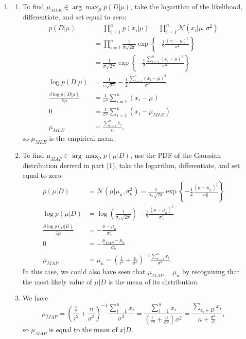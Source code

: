 \documentclass[submit]{harvardml}
\begin{document}
\begin{enumerate}
	\item 
	\begin{enumerate}
	
		\item To find $\mu_{MLE} \in \arg \max_\mu p(D|\mu)$, take the logarithm of the likelihood, differentiate, and set equal to zero:
		\begin{align*}
			p(D|\mu) &= \prod_{i=1}^n p(x_i | \mu)
			= \prod_{i=1}^n \mathcal{N}(x_i | \mu, \sigma^2) \\
			&= \prod_{i=1}^n \frac{1}{\sigma\sqrt{2\pi}}\exp\left\{-\frac12 \frac{(x_i - \mu)^2}{\sigma^2}\right\} \\
			&= \frac{1}{\sigma\sqrt{2\pi}} \exp\left\{-\frac12 \frac{\sum_{i=1}^n (x_i - \mu)^2}{\sigma^2}\right\} \\
			\log p(D|\mu) &= \frac{1}{\sigma\sqrt{2\pi}} - \frac12 \frac{\sum_{i=1}^n (x_i - \mu)^2}{\sigma^2} \\
			\frac{\partial \log p(D|\mu)}{\partial \mu} &= \frac{1}{\sigma^2} \sum_{i=1}^n(x_i - \mu) \\
			0 &= \frac{1}{\sigma^2} \sum_{i=1}^n(x_i - \mu_{MLE}) \\
			\mu_{MLE} &= \frac{\sum_{i=1}^n x_i}{n},
		\end{align*}
		so $\mu_{MLE}$ is the empirical mean.
			
		\item To find $\mu_{MAP} \in \arg \max_\mu p(\mu|D)$, use the PDF of the Gaussian distribution derived in part (1), take the logarithm, differentiate, and set equal to zero:
		\begin{align*}
			p(\mu|D) &= \mathcal{N}(\mu | \mu_n, \sigma_n^2)
			= \frac{1}{\sigma_n\sqrt{2\pi}} \exp\left\{-\frac12 \frac{(\mu - \mu_n)^2}{\sigma_n^2}\right\} \\
			\log p(\mu|D)&= \log \left(\frac{1}{\sigma_n\sqrt{2\pi}}\right) -\frac12 \frac{(\mu - \mu_n)^2}{\sigma_n^2} \\
			\frac{\partial \log p(\mu|D)}{\partial \mu} & = -\frac{\mu - \mu_n}{\sigma_n^2} \\
			0 &= -\frac{\mu_{MAP} - \mu_n}{\sigma_n^2} \\
			\mu_{MAP}&= \mu_n = \left(\frac{1}{\tau^2} + \frac{n}{\sigma^2}\right)^{-1} \frac{\sum_{i=1}^n x_i}{\sigma^2}.
		\end{align*}
		In this case, we could also have seen that $\mu_{MAP} = \mu_n$ by recognizing that the most likely value of $\mu|D$ is the mean of its distribution.
	
	\item We have
	$$\mu_{MAP} = \left(\frac{1}{\tau^2} + \frac{n}{\sigma^2}\right)^{-1} \frac{\sum_{i=1}^n x_i}{\sigma^2} = \frac{\sum_{i = 1}^n x_i}{\left(\frac{1}{\tau^2} + \frac{n}{\sigma^2}\right) \sigma^2} = \frac{\sum_{x_i \in D} x_i}{n + \frac{\sigma^2}{\tau^2}},$$
	so $\mu_{MAP}$ is equal to the mean of $x|D$.
	

\end{enumerate}
\end{enumerate}
\end{document}
